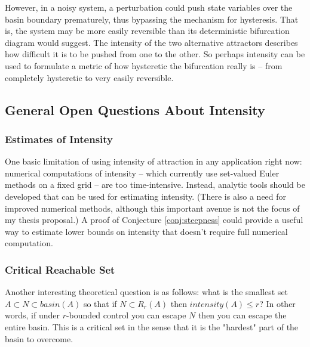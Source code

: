 However, in a noisy system, a perturbation could push state variables over the basin boundary prematurely, thus bypassing the mechanism for hysteresis. That is, the system may be more easily reversible than its deterministic bifurcation diagram would suggest. The intensity of the two alternative attractors describes how difficult it is to be pushed from one to the other. So perhaps intensity can be used to formulate a metric of how hysteretic the bifurcation really is -- from completely hysteretic to very easily reversible.


\subsection{General Open Questions About Intensity}

\subsubsection{Estimates of Intensity}
One basic limitation of using intensity of attraction in any application right now: numerical computations of intensity -- which currently use set-valued Euler methods on a fixed grid -- are too time-intensive. Instead, analytic tools should be developed that can be used for estimating intensity. (There is also a need for improved numerical methods, although this important avenue is not the focus of my thesis proposal.) A proof of Conjecture \ref{conj:steepness} could provide a useful way to estimate lower bounds on intensity that doesn't require full numerical computation. 

\subsubsection{Critical Reachable Set}

Another interesting theoretical question is as follows: what is the smallest set $A \subset N \subset basin(A)$ so that if $N \subset R_r(A)$ then $intensity(A) \leq r$? In other words, if under $r$-bounded control you can escape $N$ then you can escape the entire basin. This is a critical set in the sense that it is the "hardest" part of the basin to overcome. 

%
%
%

